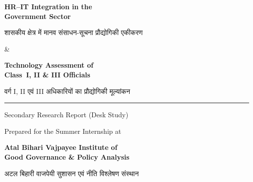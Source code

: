 \documentclass[12pt,a4paper]{article}
\newcommand{\hindi}[1]{{\hindifont #1}}
\begin{document}
\begin{titlepage}
\begin{center}

\vspace*{1cm}


\vspace{1cm}

{\Huge\bfseries\textcolor{govblue}{HR--IT Integration in the}\\\textcolor{govblue}{Government Sector}}

{\large\textcolor{accent1}{\hindi{शासकीय क्षेत्र में मानव संसाधन-सूचना प्रौद्योगिकी एकीकरण}}}

\vspace{0.5cm}

{\LARGE\textcolor{accent1}{\&}}

\vspace{0.5cm}

{\Huge\bfseries\textcolor{govblue}{Technology Assessment of}\\\textcolor{govblue}{Class~I, II \& III Officials}}

{\large\textcolor{accent1}{\hindi{वर्ग I, II एवं III अधिकारियों का प्रौद्योगिकी मूल्यांकन}}}

\vspace{1.5cm}

\rule{0.6\textwidth}{1pt}

\vspace{0.5cm}

{\Large Secondary Research Report (Desk Study)}

\vspace{0.5cm}

{\large Prepared for the Summer Internship at}

\vspace{0.3cm}

{\Large\bfseries\textcolor{govgold}{Atal Bihari Vajpayee Institute of\\Good Governance \& Policy Analysis}}

{\large\textcolor{govgold}{\hindi{अटल बिहारी वाजपेयी सुशासन एवं नीति विश्लेषण संस्थान}}}


\end{center}
\end{titlepage}
\end{document}
